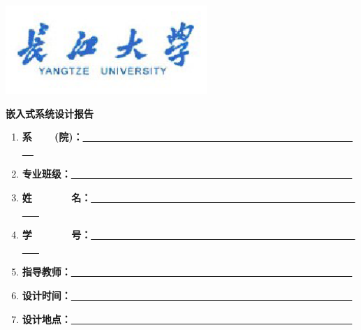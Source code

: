 \begin{titlepage}
    \centerline{\includegraphics[width=3in]{pictures/yangtzeu_blue.eps}}
    
    \centerline{\textbf{\Huge \kaishu 嵌入式系统设计报告}}
    
    \vspace{100pt}
    

    \begin{enumerate}
        \item[] \centerline{\textbf{\Large 系~~~~(院)：\underline{~~~~~~~~~~~~~~~~~~~~~~~~~~~~~~~~~~~~~~~~~~~~~~~~~~} }}
        \item[] \centerline{\textbf{\Large 专业班级：\underline{~~~~~~~~~~~~~~~~~~~~~~~~~~~~~~~~~~~~~~~~~~~~~~~~~~} }}
        \item[] \centerline{\textbf{\Large 姓~~~~~~~名：\underline{~~~~~~~~~~~~~~~~~~~~~~~~~~~~~~~~~~~~~~~~~~~~~~~~~~} }}
        \item[] \centerline{\textbf{\Large 学~~~~~~~号：\underline{~~~~~~~~~~~~~~~~~~~~~~~~~~~~~~~~~~~~~~~~~~~~~~~~~~} }}
        \item[] \centerline{\textbf{\Large 指导教师：\underline{~~~~~~~~~~~~~~~~~~~~~~~~~~~~~~~~~~~~~~~~~~~~~~~~~~} }}
        \item[] \centerline{\textbf{\Large 设计时间：\underline{~~~~~~~~~~~~~~~~~~~~~~~~~~~~~~~~~~~~~~~~~~~~~~~~~~} }}
        \item[] \centerline{\textbf{\Large 设计地点：\underline{~~~~~~~~~~~~~~~~~~~~~~~~~~~~~~~~~~~~~~~~~~~~~~~~~~} }}
    \end{enumerate}

    
\end{titlepage}
